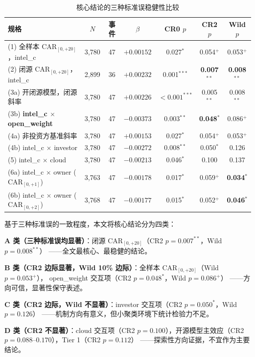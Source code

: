 \documentclass[11pt,fontset=fandol,a4paper]{ctexart}
\begin{document}
\begin{table}[htbp]
\centering
\caption{核心结论的三种标准误稳健性比较}
\label{tab:se_robust}
\small
\begin{tabular}{lcccccc}
\toprule
规格 & $N$ & 事件 & $\beta$ & CR0 $p$ & CR2 $p$ & Wild $p$ \\
\midrule
(1) 全样本 $\text{CAR}_{[0,+20]}$，intel\_c & 3{,}780 & 47 & $+0.00152$ & 0.027$^{*}$ & 0.054$^{+}$ & 0.053$^{+}$ \\
(2) 闭源 $\text{CAR}_{[0,+20]}$，intel\_c & 2{,}899 & 36 & $+0.00232$ & 0.001$^{***}$ & \textbf{0.007$^{**}$} & \textbf{0.008$^{**}$} \\
(3a) 开闭源模型，闭源斜率 & 3{,}780 & 47 & $+0.00226$ & $<0.001^{***}$ & 0.005$^{**}$ & 0.008$^{**}$ \\
(3b) \textbf{intel\_c $\times$ open\_weight} & 3{,}780 & 47 & $-0.00373$ & 0.003$^{**}$ & \textbf{0.048$^{*}$} & 0.086$^{+}$ \\
(4a) 非投资方基准斜率 & 3{,}780 & 47 & $+0.00153$ & 0.027$^{*}$ & 0.054$^{+}$ & 0.053$^{+}$ \\
(4b) intel\_c $\times$ investor & 3{,}780 & 47 & $-0.00272$ & 0.008$^{**}$ & 0.050$^{*}$ & 0.126 \\
(5) intel\_c $\times$ cloud & 3{,}780 & 47 & $-0.00213$ & 0.046$^{*}$ & 0.100 & 0.137 \\
(6a) intel\_c $\times$ owner ($\text{CAR}_{[0,+1]}$) & 3{,}763 & 47 & $-0.00178$ & 0.017$^{*}$ & 0.059$^{+}$ & \textbf{0.034$^{*}$} \\
(6b) intel\_c $\times$ owner ($\text{CAR}_{[0,+2]}$) & 3{,}768 & 47 & $-0.00177$ & 0.015$^{*}$ & 0.052$^{+}$ & \textbf{0.046$^{*}$} \\
\bottomrule
\end{tabular}
\end{table}

基于三种标准误的一致程度，本文将核心结论分为四类：

\textbf{A 类（三种标准误均显著）}：闭源 $\text{CAR}_{[0,+20]}$（CR2 $p=0.007^{**}$，Wild $p=0.008^{**}$）
——全文最核心、最稳健的结论。

\textbf{B 类（CR2 边际显著，Wild 10\% 边际）}：全样本 $\text{CAR}_{[0,+20]}$（Wild $p=0.053^{+}$），
open\_weight 交互项（CR2 $p=0.048^{*}$，Wild $p=0.086^{+}$）
——方向可信，显著性保守表述。

\textbf{C 类（CR2 边际，Wild 不显著）}：investor 交互项（CR2 $p=0.050^{*}$，Wild $p=0.126$）
——机制方向有意义，但小聚类环境下统计检验力不足。

\textbf{D 类（CR2 不显著）}：cloud 交互项（CR2 $p=0.100$），开源模型主效应（CR2 $p=0.088$--$0.170$），Tier 1（CR2 $p=0.112$）
——探索性方向证据，不宜作为主要结论。
\end{document}
